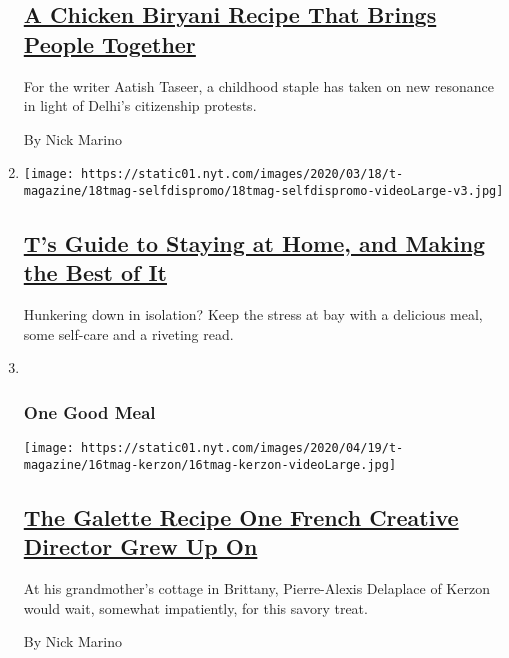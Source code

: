 \begin{enumerate}
  \hypertarget{a-chicken-biryani-recipe-that-brings-people-together}{%
  \subsection{\texorpdfstring{\href{/2020/03/10/t-magazine/aatish-taseer-chicken-biryani.html}{A
  Chicken Biryani Recipe That Brings People
  Together}}{A Chicken Biryani Recipe That Brings People Together}}\label{a-chicken-biryani-recipe-that-brings-people-together}}

  For the writer Aatish Taseer, a childhood staple has taken on new
  resonance in light of Delhi's citizenship protests.

  By Nick Marino
\item
  \texttt{[image: https://static01.nyt.com/images/2020/03/18/t-magazine/18tmag-selfdispromo/18tmag-selfdispromo-videoLarge-v3.jpg]}

  \hypertarget{ts-guide-to-staying-at-home-and-making-the-best-of-it}{%
  \subsection{\texorpdfstring{\href{/2020/03/19/t-magazine/stay-at-home-coronavirus-ideas.html}{T's
  Guide to Staying at Home, and Making the Best of
  It}}{T's Guide to Staying at Home, and Making the Best of It}}\label{ts-guide-to-staying-at-home-and-making-the-best-of-it}}

  Hunkering down in isolation? Keep the stress at bay with a delicious
  meal, some self-care and a riveting read.
\item ~
  \hypertarget{one-good-meal-3}{%
  \subsubsection{One Good Meal}\label{one-good-meal-3}}

  \texttt{[image: https://static01.nyt.com/images/2020/04/19/t-magazine/16tmag-kerzon/16tmag-kerzon-videoLarge.jpg]}

  \hypertarget{the-galette-recipe-one-french-creative-director-grew-up-on}{%
  \subsection{\texorpdfstring{\href{/2020/04/16/t-magazine/galette-recipe-pierre-alexis-delaplace.html}{The
  Galette Recipe One French Creative Director Grew Up
  On}}{The Galette Recipe One French Creative Director Grew Up On}}\label{the-galette-recipe-one-french-creative-director-grew-up-on}}

  At his grandmother's cottage in Brittany, Pierre-Alexis Delaplace of
  Kerzon would wait, somewhat impatiently, for this savory treat.

  By Nick Marino
\end{enumerate}

